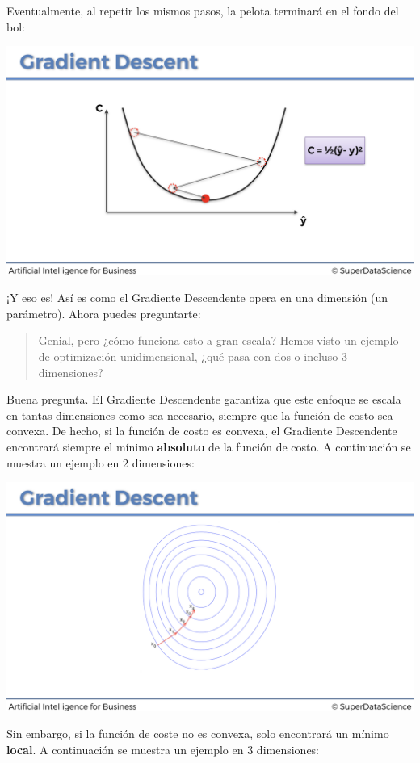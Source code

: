 \documentclass[]{book}
\begin{document}
Eventualmente, al repetir los mismos pasos, la pelota terminará en el fondo del bol:

\includegraphics{Images/ANN_23.png}

¡Y eso es! Así es como el Gradiente Descendente opera en una dimensión (un parámetro). Ahora puedes preguntarte:

\begin{quote}
Genial, pero ¿cómo funciona esto a gran escala? Hemos visto un ejemplo de optimización unidimensional, ¿qué pasa con dos o incluso 3 dimensiones?
\end{quote}

Buena pregunta. El Gradiente Descendente garantiza que este enfoque se escala en tantas dimensiones como sea necesario, siempre que la función de costo sea convexa. De hecho, si la función de costo es convexa, el Gradiente Descendente encontrará siempre el mínimo \textbf{absoluto} de la función de costo. A continuación se muestra un ejemplo en 2 dimensiones:

\includegraphics{Images/ANN_24.png}

Sin embargo, si la función de coste no es convexa, solo encontrará un mínimo \textbf{local}. A continuación se muestra un ejemplo en 3 dimensiones:
\end{document}
